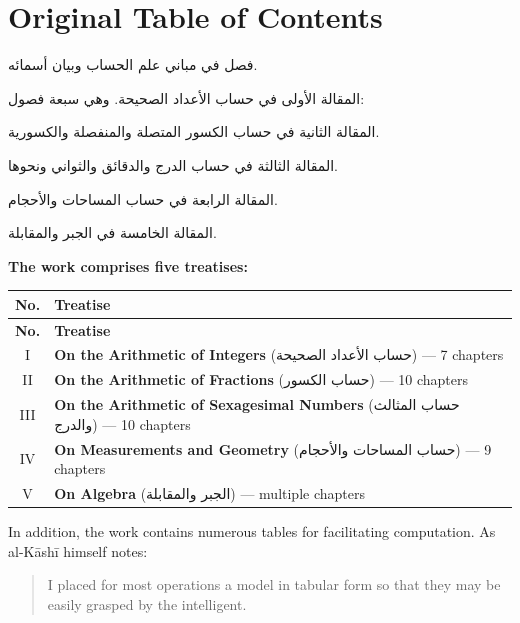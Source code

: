 \documentclass[11pt,a4paper]{article}
\newenvironment{arabicbox}{%
  \begin{framed}
  \begin{minipage}{\dimexpr\linewidth-2\fboxsep-2\fboxrule\relax}
  \setlength{\parindent}{0pt}
  \linespread{1.3}\selectfont
}{%
  \end{minipage}
  \end{framed}
}
\newcommand{\ar}[1]{{\arabicfont\beginR #1\endR}}
\begin{document}
\section*{Original Table of Contents}

\begin{arabicbox}
\begin{Arabic}
فصل في مباني علم الحساب وبيان أسمائه.

المقالة الأولى في حساب الأعداد الصحيحة. وهي سبعة فصول:

المقالة الثانية في حساب الكسور المتصلة والمنفصلة والكسورية.

المقالة الثالثة في حساب الدرج والدقائق والثواني ونحوها.

المقالة الرابعة في حساب المساحات والأحجام.

المقالة الخامسة في الجبر والمقابلة.
\end{Arabic}
\end{arabicbox}

\vspace{0.5cm}

\noindent\textbf{The work comprises five treatises:}

\begin{longtable}{|c|p{10cm}|}
\hline
\textbf{No.} & \textbf{Treatise} \\
\hline
\endfirsthead
\hline
\textbf{No.} & \textbf{Treatise} \\
\hline
\endhead
I & \textbf{On the Arithmetic of Integers} (\ar{حساب الأعداد الصحيحة}) --- 7 chapters \\
\hline
II & \textbf{On the Arithmetic of Fractions} (\ar{حساب الكسور}) --- 10 chapters \\
\hline
III & \textbf{On the Arithmetic of Sexagesimal Numbers} (\ar{حساب المثالث والدرج}) --- 10 chapters \\
\hline
IV & \textbf{On Measurements and Geometry} (\ar{حساب المساحات والأحجام}) --- 9 chapters \\
\hline
V & \textbf{On Algebra} (\ar{الجبر والمقابلة}) --- multiple chapters \\
\hline
\end{longtable}

\noindent In addition, the work contains numerous tables for facilitating
computation. As al-K\=ash\=i himself notes:
\begin{quote}
I placed for most operations a model in tabular form so that they may be
easily grasped by the intelligent.
\end{quote}
\clearpage
\end{document}
